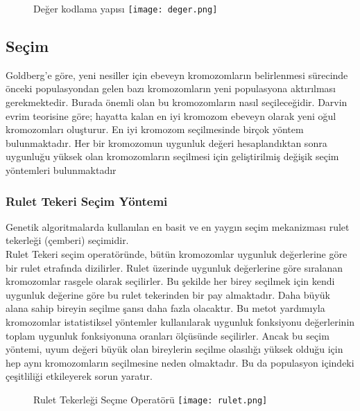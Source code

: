 \documentclass[12pt, a4paper]{article}
\begin{document}
\begin{flushleft}
	\begin{figure}[h]
		\item { Değer kodlama yapısı}
		\centering
		\texttt{[image: deger.png]}
		
	\end{figure}
	

	\subsection{ Seçim}
	Goldberg’e göre, yeni nesiller için ebeveyn kromozomların belirlenmesi 
	sürecinde önceki populasyondan gelen bazı kromozomların yeni populasyona 
	aktırılması gerekmektedir. Burada önemli olan bu kromozomların nasıl seçileceğidir. 
	Darvin evrim teorisine göre; hayatta kalan en iyi kromozom ebeveyn olarak yeni 
	oğul kromozomları oluşturur. En iyi kromozom seçilmesinde birçok yöntem 
	bulunmaktadır. Her bir kromozomun uygunluk değeri hesaplandıktan sonra 
	uygunluğu yüksek olan kromozomların seçilmesi için geliştirilmiş değişik seçim
	yöntemleri bulunmaktadır
	
	\subsubsection{Rulet Tekeri Seçim Yöntemi}
	Genetik algoritmalarda kullanılan en basit ve en yaygın seçim mekanizması 
	rulet tekerleği (çemberi) seçimidir. \\[2pt]
	Rulet Tekeri seçim operatöründe, bütün kromozomlar uygunluk değerlerine 
	göre bir rulet etrafında dizilirler. Rulet üzerinde uygunluk değerlerine göre sıralanan 
	kromozomlar rasgele olarak seçilirler. Bu şekilde her birey seçilmek için kendi 
	uygunluk değerine göre bu rulet tekerinden bir pay almaktadır. Daha büyük alana 
	sahip bireyin seçilme şansı daha fazla olacaktır. Bu metot yardımıyla kromozomlar 
	istatistiksel yöntemler kullanılarak uygunluk fonksiyonu değerlerinin toplam 
	uygunluk fonksiyonuna oranları ölçüsünde seçilirler. Ancak bu seçim yöntemi, uyum 
	değeri büyük olan bireylerin seçilme olasılığı yüksek olduğu için hep aynı 
	kromozomların seçilmesine neden olmaktadır. Bu da populasyon içindeki çeşitliliği 
	etkileyerek sorun yaratır.
	
	\begin{figure}[h]
		\item { Rulet Tekerleği Seçme Operatörü}
		\centering
		\texttt{[image: rulet.png]}
	
	\end{figure}
	

\end{flushleft}
\end{document}
